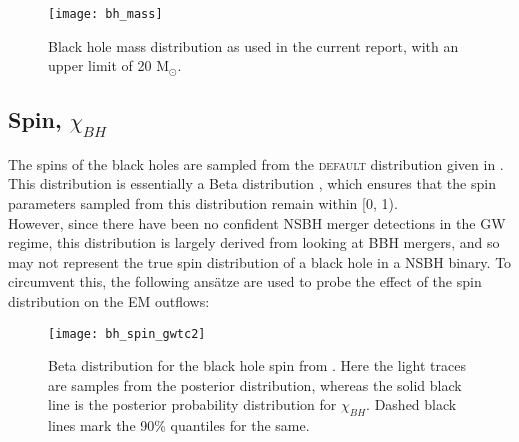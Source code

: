         \begin{figure}[H]
            \centering
            \texttt{[image: bh\_mass]}
            \caption[Black hole mass distribution with upper limit]{
                Black hole mass distribution as used in the current report, with an
                upper limit of 20 M$_\odot$.
            }
            \label{fig:bh_mass}
        \end{figure}

    \subsection{Spin, $\chi_{BH}$}\label{sub:spin-dists}
        The spins of the black holes are sampled from the \textsc{default} distribution
        given in \cite{abbott_2020B}. This distribution is essentially a Beta
        distribution , which ensures that the spin parameters sampled from this
        distribution remain within [0, 1).\\
        However, since there have been no confident NSBH merger detections in the GW
        regime, this distribution is largely derived from looking at BBH mergers, and so
        may not represent the true spin distribution of a black hole in a NSBH binary.
        To circumvent this, the following ans\"{a}tze are used to probe the effect of
        the spin distribution on the EM outflows:

        \begin{figure}[H]
            \centering
            \texttt{[image: bh\_spin\_gwtc2]}
            \caption[Black hole spin distribution from GWTC-2]{
                Beta distribution for the  black hole spin from \cite{abbott_2020B}.
                Here the light traces are samples from the posterior distribution,
                whereas the solid black line is the posterior probability distribution
                for $\chi_{BH}$. Dashed black lines mark the 90\% quantiles for the
                same.
            }
            \label{fig:bh_spin_gwtc2}
        \end{figure}


